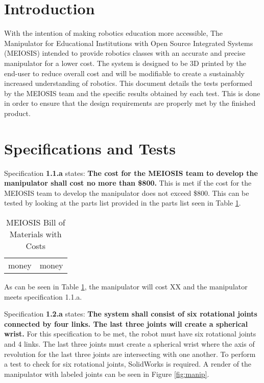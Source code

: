 

\normalem

{\tableofcontents\let\clearpage\relax\listoffigures}
\clearpage
\newpage
{}
\raggedright
\section{Introduction}\label{sec:intro}

With the intention of making robotics education more accessible, The Manipulator for Educational Institutions with Open Source Integrated Systems (MEIOSIS) intended to provide robotics classes with an accurate and precise manipulator for a lower cost. The system is designed to be 3D printed by the end-user to reduce overall cost and will be modifiable to create a sustainably increased understanding of robotics. This document details the tests performed by the MEIOSIS team and the specific results obtained by each test. This is done in order to ensure that the design requirements are properly met by the finished product.

\section{Specifications and Tests}\label{sec:tests}
Specification \textbf{1.1.a} states: \textbf{The cost for the MEIOSIS team to develop the manipulator shall cost no more than \$800.} This is met if the cost for the MEIOSIS team to develop the manipulator does not exceed \$800. This can be tested by looking at the parts list provided in the parts list seen in Table \ref{tab:bom}.

\begin{table}[htp]
  \centering
  \caption{MEIOSIS Bill of Materials with Costs}
  \label{tab:bom}
  \begin{tabular}{c|c}
      money & money\\
  \end{tabular}
\end{table}

As can be seen in Table \ref{tab:bom}, the manipulator will cost XX and the manipulator meets specification 1.1.a.

Specification \textbf{1.2.a} states: \textbf{The system shall consist of six rotational joints connected by four links. The last three joints will create a spherical wrist.} For this specification to be met, the robot must have six rotational joints and 4 links. The last three joints must create a spherical wrist where the axis of revolution for the last three joints are intersecting with one another. To perform a test to check for six rotational joints, SolidWorks is required. A render of the manipulator with labeled joints can be seen in Figure \ref{fig:manip}.


